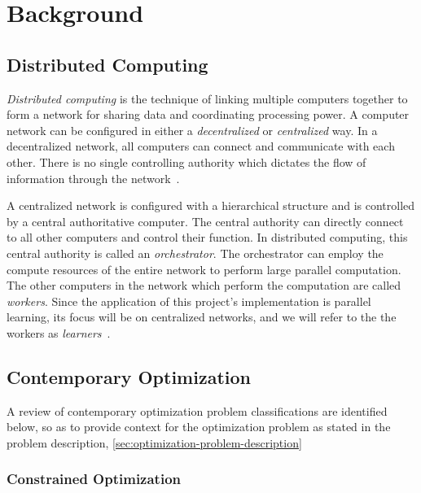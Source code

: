 \documentclass[../mthe-493-final-project.tex]{subfiles}
\begin{document}
    \chapter{Background}
    \label{ch:background}

    \section{Distributed Computing}
    \label{sec:distributed-computing}

    \textit{Distributed computing} is the technique of linking multiple computers together to form a network for sharing data and coordinating processing power. A computer network can be configured in either a \textit{decentralized} or \textit{centralized} way. In a decentralized network, all computers can connect and communicate with each other. There is no single controlling authority which dictates the flow of information through the network~\cite{noauthor_distributed_nodate}.

    A centralized network is configured with a hierarchical structure and is controlled by a central authoritative computer. The central authority can directly connect to all other computers and control their function. In distributed computing, this central authority is called an \textit{orchestrator}. The orchestrator can employ the compute resources of the entire network to perform large parallel computation. The other computers in the network which perform the computation are called \textit{workers}. Since the application of this project's implementation is parallel learning, its focus will be on centralized networks, and we will refer to the the workers as \textit{learners}~\cite{yaqub_optimal_2020}.
    
    \section{Contemporary Optimization}
    \label{sec:contemporary-optimization}

    A review of contemporary optimization problem classifications are identified below, so as to provide context for the optimization problem as stated in the problem description, \autoref{sec:optimization-problem-description}

    
    \subsection{Constrained Optimization}
    \label{ssec:constrained-optimization}
\end{document}
